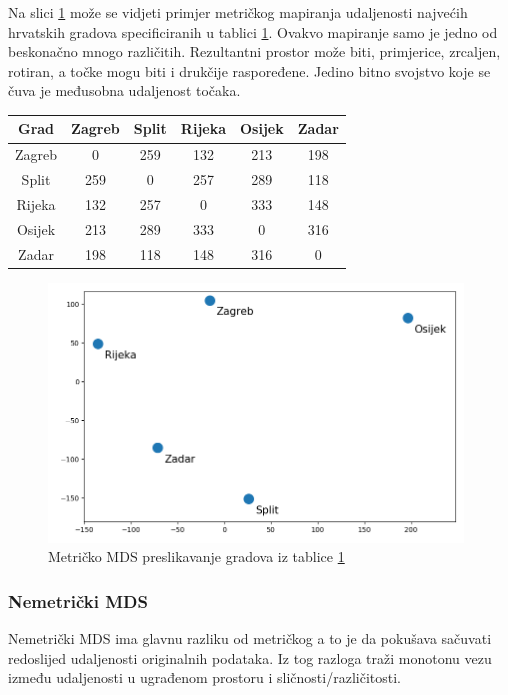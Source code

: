 \documentclass[times, utf8, diplomski]{fer}
\begin{document}
Na slici \ref{fig:mds_mapping_hr_metric} može se vidjeti primjer metričkog mapiranja udaljenosti najvećih hrvatskih gradova specificiranih u tablici \ref{tab:hr_cities}. Ovakvo mapiranje samo je jedno od beskonačno mnogo različitih. Rezultantni prostor može biti, primjerice, zrcaljen, rotiran, a točke mogu biti i drukčije raspoređene. Jedino bitno svojstvo koje se čuva je međusobna udaljenost točaka.

\begin{table}[htb]
    \centering
    \begin{tabular}{|c|c|c|c|c|c|}
        \hline
        Grad   & Zagreb & Split & Rijeka & Osijek & Zadar \\\hline
        Zagreb & 0      & 259   & 132    & 213    & 198   \\\hline
        Split  & 259    & 0     & 257    & 289    & 118   \\\hline
        Rijeka & 132    & 257   & 0      & 333    & 148   \\\hline
        Osijek & 213    & 289   & 333    & 0      & 316   \\\hline
        Zadar  & 198    & 118   & 148    & 316    & 0     \\\hline
    \end{tabular}
    \label{tab:hr_cities}
\end{table}
\begin{figure}[htb]
    \centering
    \includegraphics[width=11cm]{resources/images/reduction/mds_mapping_hr_metric.png}
    \caption{Metričko MDS preslikavanje gradova iz tablice \ref{tab:hr_cities}}
    \label{fig:mds_mapping_hr_metric}
\end{figure}


\subsubsection{Nemetrički MDS}
Nemetrički MDS  ima glavnu razliku od metričkog a to je da pokušava sačuvati redoslijed udaljenosti originalnih podataka. Iz tog razloga traži monotonu vezu između udaljenosti u ugrađenom prostoru i sličnosti/različitosti.
\end{document}
